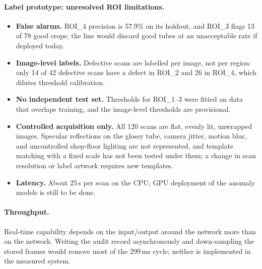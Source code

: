 \paragraph{Label prototype: unresolved ROI limitations.}
\begin{itemize}
    \item \textbf{False alarms.} ROI\_4 precision is 57.9\% on its holdout, and ROI\_3 flags 13 of 78 good crops; the line would discard good tubes at an unacceptable rate if deployed today.
    \item \textbf{Image-level labels.} Defective scans are labelled per image, not per region: only 14 of 42 defective scans have a defect in ROI\_2 and 26 in ROI\_4, which dilutes threshold calibration.
    \item \textbf{No independent test set.} Thresholds for ROI\_1--3 were fitted on data that overlaps training, and the image-level thresholds are provisional.
    \item \textbf{Controlled acquisition only.} All 120 scans are flat, evenly lit, unwrapped images. Specular reflections on the glossy tube, camera jitter, motion blur, and uncontrolled shop-floor lighting are not represented, and template matching with a fixed scale has not been tested under them; a change in scan resolution or label artwork requires new templates.
    \item \textbf{Latency.} About 25\,s per scan on the CPU; GPU deployment of the anomaly models is still to be done.
\end{itemize}

\paragraph{Throughput.} Real-time capability depends on the input/output around the network more than on the network. Writing the audit record asynchronously and down-sampling the stored frames would remove most of the 299\,ms cycle; neither is implemented in the measured system.
